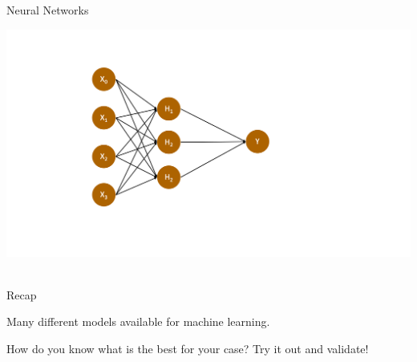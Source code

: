 \documentclass[handout]{beamer}
\begin{document}
\begin{frame}{Neural Networks}
	
	\begin{center}
		\includegraphics{../pictures/neuralnetwork_hiddenlayer.png} \\\
	\end{center}

	\begin{tiny}
	\end{tiny}
	



	
\end{frame}


\begin{frame}{Recap}
	
	Many different models available for machine learning.
	
	How do you know what is the best for your case? Try it out and validate!
	
\end{frame}
\end{document}
